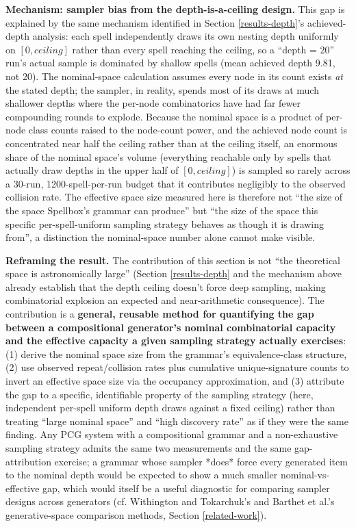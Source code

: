 \documentclass[]{article}
\begin{document}
        \textbf{Mechanism: sampler bias from the depth-is-a-ceiling design.} This gap is explained by the same mechanism identified in Section \ref{results-depth}'s achieved-depth analysis: each spell independently draws its own nesting depth uniformly on $[0, ceiling]$ rather than every spell reaching the ceiling, so a ``depth = 20'' run's actual sample is dominated by shallow spells (mean achieved depth 9.81, not 20). The nominal-space calculation assumes every node in its count exists \textit{at} the stated depth; the sampler, in reality, spends most of its draws at much shallower depths where the per-node combinatorics have had far fewer compounding rounds to explode. Because the nominal space is a product of per-node class counts raised to the node-count power, and the achieved node count is concentrated near half the ceiling rather than at the ceiling itself, an enormous share of the nominal space's volume (everything reachable only by spells that actually draw depths in the upper half of $[0, ceiling]$) is sampled so rarely across a 30-run, 1200-spell-per-run budget that it contributes negligibly to the observed collision rate. The effective space size measured here is therefore not ``the size of the space Spellbox's grammar can produce'' but ``the size of the space this specific per-spell-uniform sampling strategy behaves as though it is drawing from'', a distinction the nominal-space number alone cannot make visible.
        
        \textbf{Reframing the result.} The contribution of this section is not ``the theoretical space is astronomically large'' (Section \ref{results-depth} and the mechanism above already establish that the depth ceiling doesn't force deep sampling, making combinatorial explosion an expected and near-arithmetic consequence). The contribution is a \textbf{general, reusable method for quantifying the gap between a compositional generator's nominal combinatorial capacity and the effective capacity a given sampling strategy actually exercises}: (1) derive the nominal space size from the grammar's equivalence-class structure, (2) use observed repeat/collision rates plus cumulative unique-signature counts to invert an effective space size via the occupancy approximation, and (3) attribute the gap to a specific, identifiable property of the sampling strategy (here, independent per-spell uniform depth draws against a fixed ceiling) rather than treating ``large nominal space'' and ``high discovery rate'' as if they were the same finding. Any PCG system with a compositional grammar and a non-exhaustive sampling strategy admits the same two measurements and the same gap-attribution exercise; a grammar whose sampler *does* force every generated item to the nominal depth would be expected to show a much smaller nominal-vs-effective gap, which would itself be a useful diagnostic for comparing sampler designs across generators (cf. Withington and Tokarchuk's and Barthet et al.'s generative-space comparison methods, Section \ref{related-work}).
        
\end{document}
